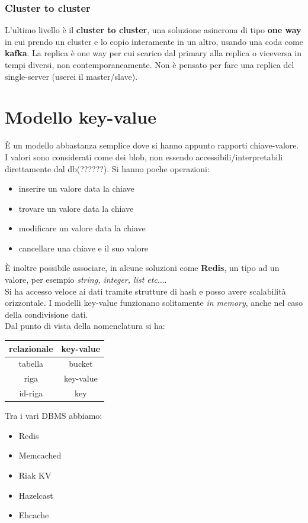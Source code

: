 \documentclass[a4paper,12pt, oneside]{book}
\begin{document}
\subsubsection{Cluster to cluster}
L'ultimo livello è il \textbf{cluster to cluster}, una soluzione asincrona di
tipo \textbf{one way} in cui prendo un cluster e lo copio interamente in un
altro, usando una coda come \textbf{kafka}. La replica è one way per cui scarico
dal primary alla replica o viceversa in tempi diversi, non
contemporaneamente. Non è pensato per fare una replica del single-server (userei
il master/slave).
\section{Modello key-value}
È un modello abbastanza semplice dove si hanno appunto rapporti chiave-valore. I
valori sono considerati come dei blob, non essendo accessibili/interpretabili
direttamente dal db(??????). Si hanno poche operazioni:
\begin{itemize}
  \item inserire un valore data la chiave
  \item trovare un valore data la chiave
  \item modificare un valore data la chiave
  \item cancellare una chiave e il suo valore
\end{itemize}
È inoltre possibile associare, in alcune soluzioni come \textbf{Redis}, un tipo
ad un valore, per esempio \textit{string, integer, list etc$\ldots$}.\\
Si ha accesso veloce ai dati tramite strutture di hash e posso avere scalabilità
orizzontale. I modelli key-value funzionano solitamente \textit{in memory},
anche nel caso della condivisione dati.\\
Dal punto di vista della nomenclatura si ha:
\begin{table}[H]
  \centering
  \begin{tabular}{c|c}
    relazionale & key-value\\
    \hline
    tabella & bucket\\
    riga & key-value\\
    id-riga & key
  \end{tabular}
\end{table}
Tra i vari DBMS abbiamo:
\begin{itemize}
  \item Redis
  \item Memcached
  \item Riak KV
  \item Hazelcast
  \item Ehcache
\end{itemize}
\end{document}
